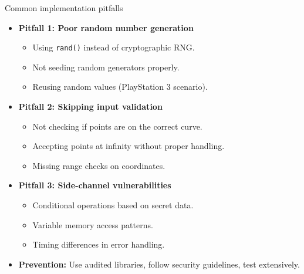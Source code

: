 \documentclass[aspectratio=169, lualatex, handout]{beamer}
\begin{document}
\begin{frame}{Common implementation pitfalls}
	\begin{itemize}[<+->]
		\item \textbf{Pitfall 1: Poor random number generation}
		      \begin{itemize}
			      \item Using \texttt{rand()} instead of cryptographic RNG.
			      \item Not seeding random generators properly.
			      \item Reusing random values (PlayStation 3 scenario).
		      \end{itemize}
		\item \textbf{Pitfall 2: Skipping input validation}
		      \begin{itemize}
			      \item Not checking if points are on the correct curve.
			      \item Accepting points at infinity without proper handling.
			      \item Missing range checks on coordinates.
		      \end{itemize}
		\item \textbf{Pitfall 3: Side-channel vulnerabilities}
		      \begin{itemize}
			      \item Conditional operations based on secret data.
			      \item Variable memory access patterns.
			      \item Timing differences in error handling.
		      \end{itemize}
		\item \textbf{Prevention:} Use audited libraries, follow security guidelines, test extensively.
	\end{itemize}
\end{frame}
\end{document}

